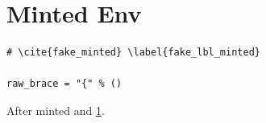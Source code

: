\documentclass{article}
\begin{document}
\section{Minted Env}\label{sec:env_minted}
\begin{verbatim}
# \cite{fake_minted} \label{fake_lbl_minted}

raw_brace = "{" % ()
\end{verbatim}
After minted \cite{k1,k2} and \ref{sec:env_minted}.


\end{document}
